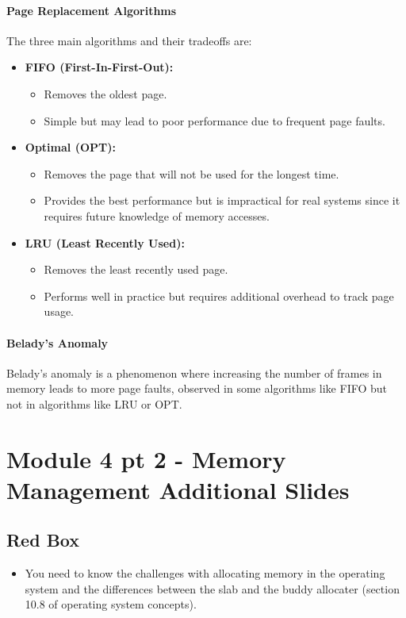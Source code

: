 \documentclass{article}
\begin{document}
\paragraph{Page Replacement Algorithms}
The three main algorithms and their tradeoffs are:
\begin{itemize}
    \item \textbf{FIFO (First-In-First-Out):}
    \begin{itemize}
        \item Removes the oldest page.
        \item Simple but may lead to poor performance due to frequent page faults.
    \end{itemize}
    \item \textbf{Optimal (OPT):}
    \begin{itemize}
        \item Removes the page that will not be used for the longest time.
        \item Provides the best performance but is impractical for real systems since it requires future knowledge of memory accesses.
    \end{itemize}
    \item \textbf{LRU (Least Recently Used):}
    \begin{itemize}
        \item Removes the least recently used page.
        \item Performs well in practice but requires additional overhead to track page usage.
    \end{itemize}
\end{itemize}

\paragraph{Belady’s Anomaly}
Belady’s anomaly is a phenomenon where increasing the number of frames in memory leads to more page faults, observed in some algorithms like FIFO but not in algorithms like LRU or OPT.


\section{Module 4 pt 2 - Memory Management Additional Slides}
\subsection{Red Box}
\begin{itemize}
    \item You need to know the challenges with allocating memory in the operating system and the differences between the slab and the buddy
    allocater (section 10.8 of operating system concepts).
\end{itemize}
\end{document}
